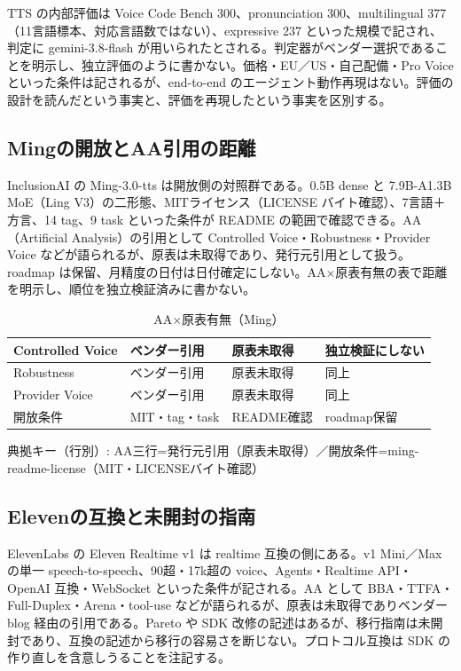 \documentclass[lualatex,a4paper,10pt]{jlreq}
\begin{document}
TTS の内部評価は Voice Code Bench 300、pronunciation 300、multilingual 377（11言語標本、対応言語数ではない）、expressive 237 といった規模で記され、判定に gemini-3.8-flash が用いられたとされる。判定器がベンダー選択であることを明示し、独立評価のように書かない。価格・EU／US・自己配備・Pro Voice といった条件は記されるが、end-to-end のエージェント動作再現はない。評価の設計を読んだという事実と、評価を再現したという事実を区別する。


\subsection*{Mingの開放とAA引用の距離}


InclusionAI の Ming-3.0-tts は開放側の対照群である。0.5B dense と 7.9B-A1.3B MoE（Ling V3）の二形態、MITライセンス（LICENSE バイト確認）、7言語＋方言、14 tag、9 task といった条件が README の範囲で確認できる。AA（Artificial Analysis）の引用として Controlled Voice・Robustness・Provider Voice などが語られるが、原表は未取得であり、発行元引用として扱う。roadmap は保留、月精度の日付は日付確定にしない。AA×原表有無の表で距離を明示し、順位を独立検証済みに書かない。


\begin{table}[htbp]\centering\footnotesize
\caption{AA×原表有無（Ming）}
\begin{tabularx}{0.96\linewidth}{@{}lXXX@{}}
\toprule
Controlled Voice & ベンダー引用 & 原表未取得 & 独立検証にしない \\
\midrule
Robustness & ベンダー引用 & 原表未取得 & 同上 \\
Provider Voice & ベンダー引用 & 原表未取得 & 同上 \\
開放条件 & MIT・tag・task & README確認 & roadmap保留 \\
\bottomrule
\end{tabularx}
{\scriptsize\color{SurveyMuted} 典拠キー（行別）: AA三行=発行元引用（原表未取得）／開放条件=ming-readme-license（MIT・LICENSEバイト確認）\par}
\end{table}


\subsection*{Elevenの互換と未開封の指南}


ElevenLabs の Eleven Realtime v1 は realtime 互換の側にある。v1 Mini／Max の単一 speech-to-speech、90超・17k超の voice、Agents・Realtime API・OpenAI 互換・WebSocket といった条件が記される。AA として BBA・TTFA・Full-Duplex・Arena・tool-use などが語られるが、原表は未取得でありベンダー blog 経由の引用である。Pareto や SDK 改修の記述はあるが、移行指南は未開封であり、互換の記述から移行の容易さを断じない。プロトコル互換は SDK の作り直しを含意しうることを注記する。
\end{document}
